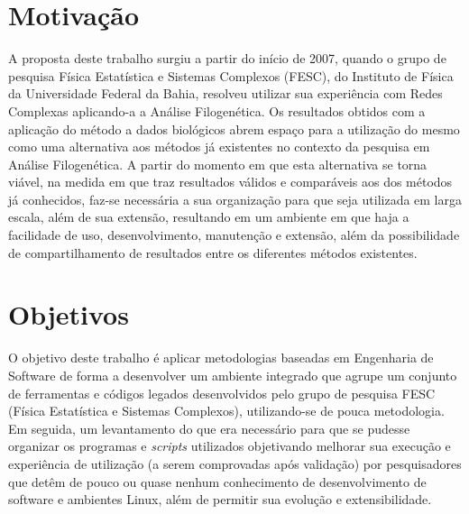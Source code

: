 \section{Motivação}

A proposta deste trabalho surgiu a partir do início de 2007, quando o grupo de pesquisa Física Estatística e Sistemas Complexos (FESC),
do Instituto de Física da Universidade Federal da Bahia, resolveu utilizar sua experiência com Redes Complexas aplicando-a a Análise Filogenética.
Os resultados obtidos com a aplicação do método a dados biológicos abrem espaço para a utilização do mesmo como uma alternativa aos métodos
já existentes no contexto da pesquisa em Análise Filogenética. A partir do momento em que esta alternativa se torna viável, na medida em que traz resultados
válidos e comparáveis aos dos métodos já conhecidos,
faz-se necessária a sua organização para que seja utilizada em larga escala, além de sua extensão,
resultando em um ambiente em que haja a facilidade de uso, desenvolvimento, manutenção e extensão, além da possibilidade de compartilhamento de
resultados entre os diferentes métodos existentes.

\section{Objetivos} \label{sec:objetivos}

O objetivo deste trabalho é aplicar metodologias baseadas em Engenharia de Software de forma a desenvolver um ambiente integrado que agrupe
um conjunto de ferramentas e códigos legados desenvolvidos pelo grupo de pesquisa FESC (Física Estatística e Sistemas Complexos),
utilizando-se de pouca metodologia. Em seguida, um levantamento do que era necessário para que
se pudesse organizar os programas e \textit{scripts} utilizados objetivando melhorar sua execução e experiência de utilização (a serem comprovadas após validação)
 por pesquisadores que detêm de
pouco ou quase nenhum conhecimento de desenvolvimento de software e ambientes Linux, além de permitir sua evolução e extensibilidade.




